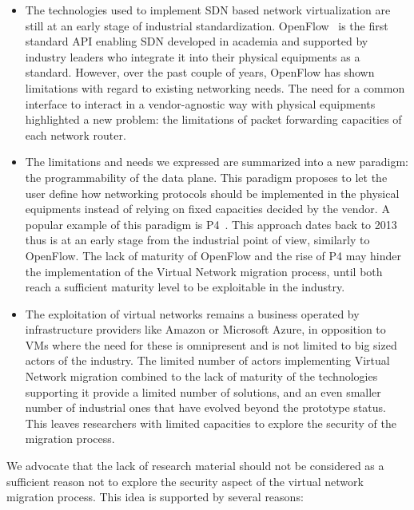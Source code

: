 \begin{itemize}
    \item The technologies used to implement SDN based network virtualization are still at an early stage of industrial standardization. OpenFlow~\cite{Openflow-McKeown2008} is the first standard API enabling SDN developed in academia and supported by industry leaders who integrate it into their physical equipments as a standard. However, over the past couple of years, OpenFlow has shown limitations with regard to existing networking needs. The need for a common interface to interact in a vendor-agnostic way with physical equipments highlighted a new problem: the limitations of packet forwarding capacities of each network router. 
    
    \item The limitations and needs we expressed are summarized into a new paradigm: the programmability of the data plane.
    This paradigm proposes to let the user define how networking protocols should be implemented in the physical equipments instead of relying on fixed capacities decided by the vendor. A popular example of this paradigm is P4~\cite{P4}.
    This approach dates back to 2013 thus is at an early stage from the industrial point of view, similarly to OpenFlow.
    The lack of maturity of OpenFlow and the rise of P4 may hinder the implementation of the Virtual Network migration process, until both reach a sufficient maturity level to be exploitable in the industry.
    
    \item The exploitation of virtual networks remains a business operated by infrastructure providers like Amazon or Microsoft Azure, in opposition to VMs where the need for these is omnipresent and is not limited to big sized actors of the industry. The limited number of actors implementing Virtual Network migration combined to the lack of maturity of the technologies supporting it provide a limited number of solutions, and an even smaller number of industrial ones that have evolved beyond the prototype status. This leaves researchers with limited capacities to explore the security of the migration process.
\end{itemize}

We advocate that the lack of research material should not be considered as a sufficient reason not to explore the security aspect of the virtual network migration process. This idea is supported by several reasons:

